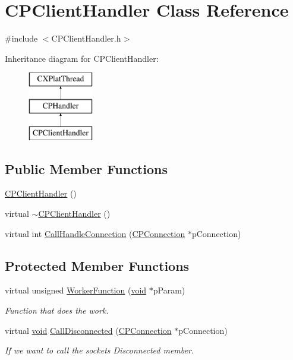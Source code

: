 \hypertarget{class_c_p_client_handler}{\section{\-C\-P\-Client\-Handler \-Class \-Reference}
\label{class_c_p_client_handler}
}


{\ttfamily \#include $<$\-C\-P\-Client\-Handler.\-h$>$}

\-Inheritance diagram for \-C\-P\-Client\-Handler\-:\begin{figure}[H]
\begin{center}
\leavevmode
\includegraphics[height=3.000000cm]{class_c_p_client_handler}
\end{center}
\end{figure}
\subsection*{\-Public \-Member \-Functions}
\begin{DoxyCompactItemize}
\item 
\hyperlink{class_c_p_client_handler_a26b86af12546043f0079e1527fd420a6}{\-C\-P\-Client\-Handler} ()
\item 
virtual \hyperlink{class_c_p_client_handler_a3469cc970781324be0648feaca88b56c}{$\sim$\-C\-P\-Client\-Handler} ()
\item 
virtual int \hyperlink{class_c_p_client_handler_a7f6d153c5104840663b7225a36ea7609}{\-Call\-Handle\-Connection} (\hyperlink{class_c_p_connection}{\-C\-P\-Connection} $\ast$p\-Connection)
\end{DoxyCompactItemize}
\subsection*{\-Protected \-Member \-Functions}
\begin{DoxyCompactItemize}
\item 
virtual unsigned \hyperlink{class_c_p_client_handler_a88117dfe5e1e6d2f5d953277bc1a3044}{\-Worker\-Function} (\hyperlink{_cpclient_8h_a6464f7480a0fd0ee170cba12b2c0497f}{void} $\ast$p\-Param)
\begin{DoxyCompactList}\small\item\em \-Function that does the work. \end{DoxyCompactList}\item 
virtual \hyperlink{_cpclient_8h_a6464f7480a0fd0ee170cba12b2c0497f}{void} \hyperlink{class_c_p_client_handler_ad6df6ba23365c140780ddd27cb44bd08}{\-Call\-Disconnected} (\hyperlink{class_c_p_connection}{\-C\-P\-Connection} $\ast$p\-Connection)
\begin{DoxyCompactList}\small\item\em \-If we want to call the sockets \-Disconnected member. \end{DoxyCompactList}\end{DoxyCompactItemize}


